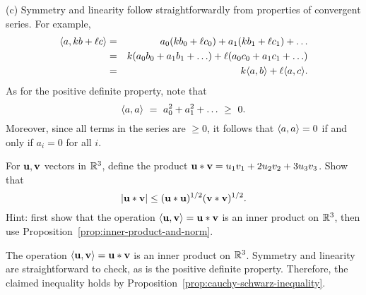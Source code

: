 \begin{ex}
\begin{sol}
    (c) Symmetry and linearity follow straightforwardly from
    properties of convergent series. For example,
    \begin{eqnarray*}
      \langle a,kb+\ell c\rangle
      &=& a_0(kb_0+\ell c_0) + a_1(kb_1+\ell c_1) + \ldots \\
      &=& k(a_0b_0 + a_1b_1 + \ldots) + \ell(a_0c_0 + a_1c_1 + \ldots) \\
      &=& k\langle a,b\rangle + \ell\langle a,c\rangle.
    \end{eqnarray*}
    As for the positive definite property, note that
    \begin{equation*}
      \langle a,a\rangle
      ~=~ a_0^2 + a_1^2 + \ldots
      ~\geq~ 0.
    \end{equation*}
    Moreover, since all terms in the series are $\geq 0$, it follows
    that $\langle a,a\rangle=0$ if and only if $a_i=0$ for all $i$.
  \end{sol}
\end{ex}

\begin{ex}
  For $\vect{u},\vect{v}$ vectors in $\mathbb{R}^3$, define the product
  $\vect{u}\ast \vect{v} = u_1v_1+2u_2v_2+3u_3v_3$. Show
  that
  \begin{equation*}
    \abs{\vect{u}\ast \vect{v}} \leq (\vect{u}\ast \vect{u})^{1/2}
    (\vect{v}\ast \vect{v})^{1/2}.
  \end{equation*}
  Hint: first show that the operation
  $\iprod{\vect{u},\vect{v}}=\vect{u}\ast\vect{v}$ is an inner product
  on $\mathbb{R}^3$, then use Proposition~\ref{prop:inner-product-and-norm}.
  \begin{sol}
    The operation $\iprod{\vect{u},\vect{v}}=\vect{u}\ast\vect{v}$ is
    an inner product on $\mathbb{R}^3$. Symmetry and linearity are
    straightforward to check, as is the positive definite
    property. Therefore, the claimed inequality holds by
    Proposition~\ref{prop:cauchy-schwarz-inequality}.
  \end{sol}
\end{ex}

